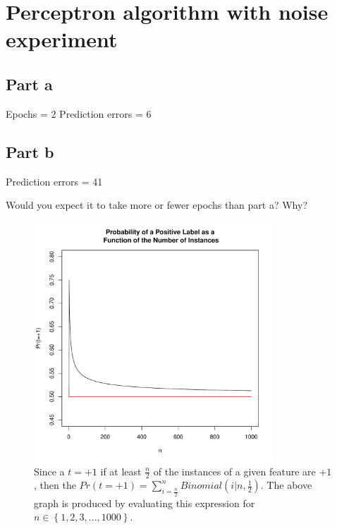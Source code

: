 \documentclass{article}
\begin{document}
\clearpage
\section{Perceptron algorithm with noise experiment}

\subsection*{Part a}
Epochs = 2
Prediction errors = 6

\subsection*{Part b}

Prediction errors = 41

Would you expect it to take more or fewer epochs than part a? Why?

\begin{figure}[h!]
\centering
\includegraphics[width=0.8\textwidth]{bFig.pdf}
\caption{Since a $t=+1$ if at least $\frac{n}{2}$ of the instances of a given feature are $+1$, then the \mbox{$Pr(t=+1)=\sum_{i=\frac{n}{2}}^n Binomial(i|n,\frac{1}{2})$.}
The above graph is produced by evaluating this expression for \mbox{$n\in\left\{1,2,3,...,1000\right\}$.}
}
\label{bFig}
\end{figure}
\end{document}
